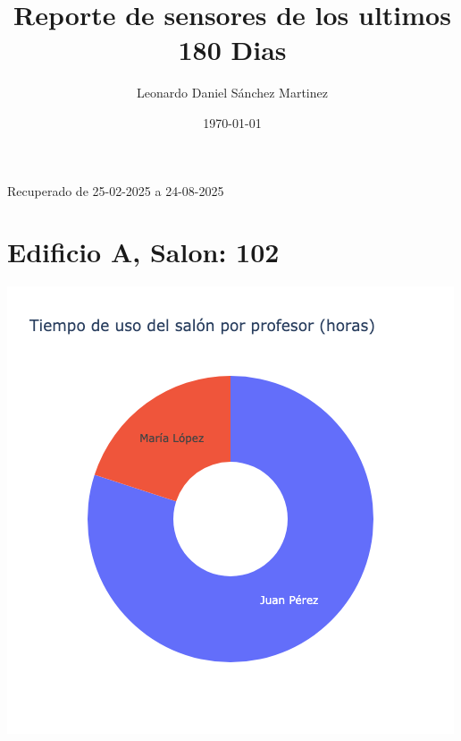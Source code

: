 \documentclass{article}
\title{Reporte de sensores de los ultimos 180 Dias}
\author{Leonardo Daniel Sánchez Martinez}
\date{\today}
\begin{document}
    \maketitle
    Recuperado de 25-02-2025 a 24-08-2025

    \section{Edificio A, Salon: 102}
    \noindent
    \begin{minipage}{0.48\textwidth}
        \centering
        \includegraphics[width=\textwidth]{../img/pie/UP102-180Dias-24-08-2025.png}
    \end{minipage}
    \hfill
\end{document}
